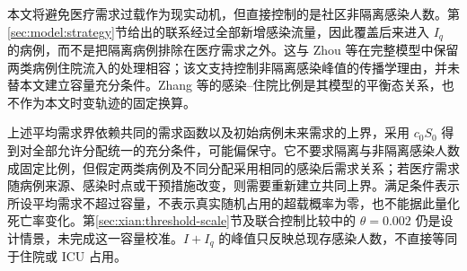 本文将避免医疗需求过载作为现实动机，但直接控制的是社区非隔离感染人数。第\ref{sec:model:strategy}节给出的联系经过全部新增感染流量，因此覆盖后来进入 $I_q$ 的病例，而不是把隔离病例排除在医疗需求之外。这与 Zhou 等\cite{Zhou2024SPCI}在完整模型中保留两类病例住院流入的处理相容；该文支持控制非隔离感染峰值的传播学理由，并未替本文建立容量充分条件。Zhang 等\cite[注记1]{Zhang2026Behavior}的感染--住院比例是其模型的平衡态关系，也不作为本文时变轨迹的固定换算。

上述平均需求界依赖共同的需求函数以及初始病例未来需求的上界，采用 $c_0S_0$ 得到对全部允许分配统一的充分条件，可能偏保守。它不要求隔离与非隔离感染人数成固定比例，但假定两类病例及不同分配采用相同的感染后需求关系；若医疗需求随病例来源、感染时点或干预措施改变，则需要重新建立共同上界。满足条件表示所设平均需求不超过容量，不表示真实随机占用的超载概率为零，也不能据此量化死亡率变化。第\ref{sec:xian:threshold-scale}节及联合控制比较中的 $\theta=0.002$ 仍是设计情景，未完成这一容量校准。$I+I_q$ 的峰值只反映总现存感染人数，不直接等同于住院或 ICU 占用。
